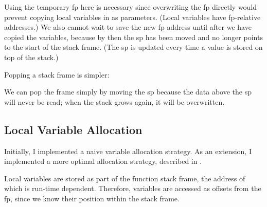 \documentclass[00-main.tex]{subfiles}
\begin{document}
Using the temporary \gls{fp} here is necessary since overwriting the \gls{fp} directly would prevent copying local variables in as parameters.
(Local variables have \gls{fp}-relative addresses.)
We also cannot wait to save the new \gls{fp} address until after we have copied the variables, because by then the \gls{sp} has been moved and no longer points to the start of the stack frame.
(The \gls{sp} is updated every time a value is stored on top of the stack.)

Popping a stack frame is simpler:


We can pop the frame simply by moving the \gls{sp} because the data above the \gls{sp} will never be read; when the stack grows again, it will be overwritten.

\subsection{Local Variable Allocation}\label{sec:impl:local variable allocation}

Initially, I implemented a naive variable allocation strategy.
As an extension, I implemented a more optimal allocation strategy, described in .

Local variables are stored as part of the function stack frame, the address of which is run-time dependent.
Therefore, variables are accessed as offsets from the \gls{fp}, since we know their position within the stack frame.
\end{document}
